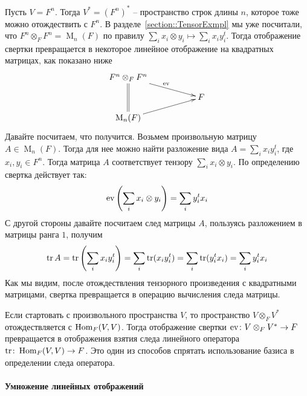 Пусть $V = F^n$.
Тогда $V^* = (F^n)^*$ -- пространство строк длины $n$, которое тоже можно отождествить с $F^n$.
В разделе~\ref{section::TensorExmpl} мы уже посчитали, что $F^n\otimes_F F^n = \operatorname{M}_n(F)$ по правилу $\sum_i x_i\otimes y_i\mapsto \sum_i x_i y_i^t$.
Тогда отображение свертки превращается в некоторое линейное отображение на квадратных матрицах, как показано ниже
\[
\xymatrix@R=10pt{
	{F^n\otimes_F F^n}\ar@{=}[dd]\ar[rrd]^{\ev}&{}&{}\\
	{}&{}&{F}\\
	{\operatorname{M}_n(F)}\ar[rru]&{}&{}\\
}
\]
Давайте посчитаем, что получится.
Возьмем произвольную матрицу $A\in \operatorname{M}_n(F)$.
Тогда для нее можно найти разложение вида $A = \sum_i x_iy_i^t$, где $x_i,y_i\in F^n$.
Тогда матрица $A$ соответствует тензору $\sum_i x_i \otimes y_i$.
По определению свертка действует так:
\[
\operatorname{ev}\left(\sum_i x_i\otimes y_i\right) = \sum_i y_i^t x_i
\]
С другой стороны давайте посчитаем след матрицы $A$, пользуясь разложением в матрицы ранга $1$, получим
\[
\operatorname{tr} A = \operatorname{tr}\left(\sum_i x_i y_i^t\right) = \sum_i \operatorname{tr}(x_i y_i^t) = \sum_i \operatorname{tr}(y_i^t x_i) = \sum_i y_i^t x_i
\]
Как мы видим, после отождествления тензорного произведения с квадратными матрицами, свертка превращается в операцию вычисления следа матрицы.

Если стартовать с произвольного пространства $V$,  то пространство $V\otimes_F V^*$ отождествляется с $\operatorname{Hom}_F(V, V)$.
Тогда отображение свертки $\operatorname{ev}\colon V\otimes_F V^*\to F$ превращается в отображения взятия следа линейного оператора $\operatorname{tr}\colon \operatorname{Hom}_F(V, V)\to F$.
Это один из способов спрятать использование базиса в определении следа оператора.


\paragraph{Умножение линейных отображений}

